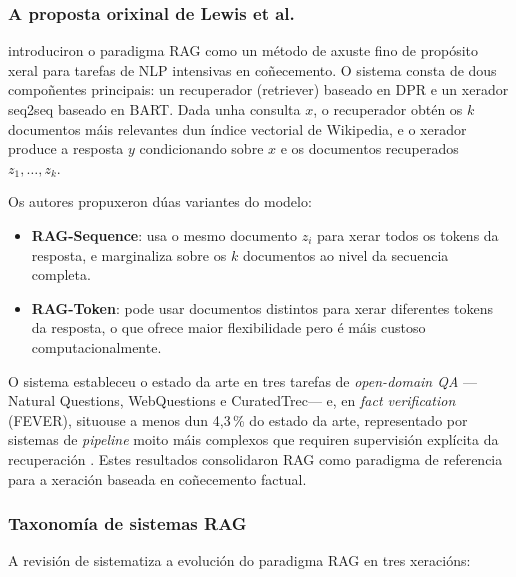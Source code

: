 \documentclass[11pt, a4paper, oneside]{report}
\begin{document}
\subsubsection{A proposta orixinal de Lewis et al.}
\label{sec:lewis2020}

\citet{lewis2020retrieval} introduciron o paradigma RAG como un método de axuste fino
de propósito xeral para tarefas de NLP intensivas en coñecemento. O sistema consta de
dous compoñentes principais: un recuperador (retriever) baseado en DPR
\citep{karpukhin2020dense} e un xerador seq2seq baseado en BART. Dada unha consulta
$x$, o recuperador obtén os $k$ documentos máis relevantes dun índice vectorial de
Wikipedia, e o xerador produce a resposta $y$ condicionando sobre $x$ e os documentos
recuperados $z_1, \ldots, z_k$.

Os autores propuxeron dúas variantes do modelo:

\begin{itemize}
  \item \textbf{RAG-Sequence}: usa o mesmo documento $z_i$ para xerar todos os tokens
    da resposta, e marginaliza sobre os $k$ documentos ao nivel da secuencia completa.
  \item \textbf{RAG-Token}: pode usar documentos distintos para xerar diferentes tokens
    da resposta, o que ofrece maior flexibilidade pero é máis custoso computacionalmente.
\end{itemize}

O sistema estableceu o estado da arte en tres tarefas de \textit{open-domain QA}
—Natural Questions, WebQuestions e CuratedTrec— e, en \textit{fact verification}
(FEVER), situouse a menos dun 4{,}3\,\% do estado da arte, representado por sistemas de
\textit{pipeline} moito máis complexos que requiren supervisión explícita da recuperación
\citep{lewis2020retrieval}. Estes resultados consolidaron RAG como paradigma de
referencia para a xeración baseada en coñecemento factual.

\subsubsection{Taxonomía de sistemas RAG}
\label{sec:taxonomia_rag}

A revisión de \citet{gao2023retrieval} sistematiza a evolución do paradigma RAG en tres
xeracións:
\end{document}
